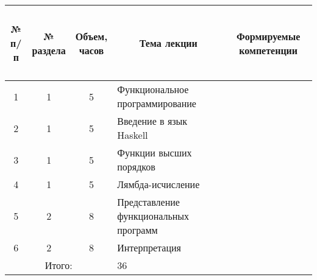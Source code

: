 
\begin{center}
\begin{longtable}{|c|c|c|p{}|c|}\hline
\multicolumn{1}{|c|}{\parbox{1cm}{\bfseries~\\№\\п/п\\~}} &
\multicolumn{1}{c|}{\parbox{2cm}{\bfseries №\\раздела}} &
\multicolumn{1}{c|}{\parbox{3cm}{\bfseries Объем,\\часов}} &
\multicolumn{1}{c|}{\bfseries Тема лекции} &
\multicolumn{1}{c|}{\parbox{3.5cm}{\bfseries Формируемые компетенции}} \\\hline
1 & 1 & 5 & Функциональное программирование & \compone{} \\\hline
2 & 1 & 5 & Введение в язык Haskell & \compone{} \\\hline
3 & 1 & 5 & Функции высших порядков & \compthree{} \\\hline
4 & 1 & 5 & Лямбда-исчисление & \compthree{} \\\hline
5 & 2 & 8 & Представление функциональных программ & \comptwo{} \\\hline
6 & 2 & 8 & Интерпретация & \comptwo{} \\\hline

\multicolumn{3}{|c|}{Итого:} & 36 & \\\hline
\end{longtable}
\end{center}



